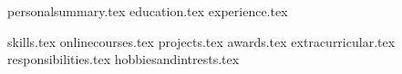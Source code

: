 \documentclass[11pt, a4paper]{awesome-cv}
\newcommand*{\sectiondir}{resume/}
\begin{document}
\makecvheader

{personalsummary.tex}
{education.tex}
{experience.tex}
\pagebreak

{skills.tex}
{onlinecourses.tex}
{projects.tex}
{awards.tex}
{extracurricular.tex}
{responsibilities.tex}
{hobbiesandintrests.tex}
\end{document}
